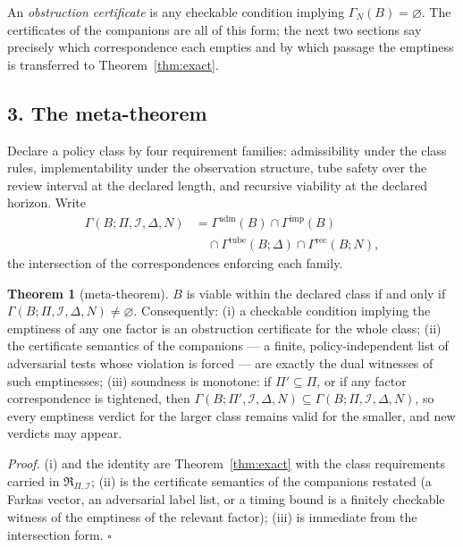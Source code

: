 \documentclass[10pt,twocolumn]{article}
\theoremstyle{definition}
\newtheorem{theorem}{Theorem}
\begin{document}
An \emph{obstruction certificate} is any checkable condition implying
\(\Gamma_{N}(B) = \varnothing\). The certificates of the companions are all
of this form; the next two sections say precisely which correspondence each
empties and by which passage the emptiness is transferred to
Theorem~\ref{thm:exact}.

\subsection{3. The meta-theorem}\label{meta}

Declare a policy class by four requirement families: admissibility under the
class rules, implementability under the observation structure, tube safety
over the review interval at the declared length, and recursive viability at
the declared horizon. Write
\begin{align*}
\Gamma(B; \Pi, \mathcal{I}, \Delta, N)
&= \Gamma^{\mathrm{adm}}(B) \cap \Gamma^{\mathrm{imp}}(B)\\
&\quad \cap \Gamma^{\mathrm{tube}}(B; \Delta) \cap \Gamma^{\mathrm{rec}}(B; N),
\end{align*}
the intersection of the correspondences enforcing each family.

\begin{theorem}[meta-theorem]\label{thm:meta}
\(B\) is viable within the declared class if and only if
\(\Gamma(B; \Pi, \mathcal{I}, \Delta, N) \neq \varnothing\). Consequently:
(i) a checkable condition implying the emptiness of any one factor is an
obstruction certificate for the whole class;
(ii) the certificate semantics of the companions --- a finite,
policy-independent list of adversarial tests whose violation is forced ---
are exactly the dual witnesses of such emptinesses;
(iii) soundness is monotone: if \(\Pi' \subseteq \Pi\), or if any factor
correspondence is tightened, then
\(\Gamma(B; \Pi', \mathcal{I}, \Delta, N) \subseteq \Gamma(B; \Pi,
\mathcal{I}, \Delta, N)\), so every emptiness verdict for the larger class
remains valid for the smaller, and new verdicts may appear.
\end{theorem}

\emph{Proof.} (i) and the identity are Theorem~\ref{thm:exact} with the
class requirements carried in \(\mathfrak{R}_{\Pi,\mathcal{I}}\); (ii) is
the certificate semantics of the companions restated (a Farkas vector, an
adversarial label list, or a timing bound is a finitely checkable witness of
the emptiness of the relevant factor); (iii) is immediate from the
intersection form. \hfill\(\square\)
\end{document}
